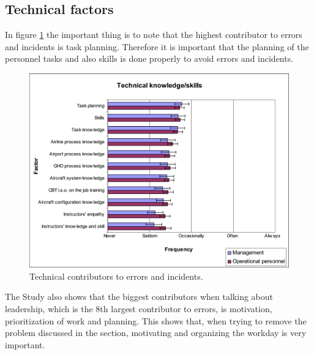 \subsection{Technical factors}
In figure \ref{TechnicalFactors} the important thing is to note that the highest contributor to errors and incidents is task planning. Therefore it is important that the planning of the personnel tasks and also skills is done properly to avoid errors and incidents.

\begin{figure}[H]
\centering
\includegraphics[width=\textwidth]{Grafik/TechnicalFactors}
\caption{Technical contributors to errors and incidents.}
\label{TechnicalFactors}
\end{figure}

The Study also shows that the biggest contributors when talking about leadership, which is the 8th largest contributor to errors, is motivation, prioritization of work and planning. This shows that, when trying to remove the problem discussed in the section, motivating and organizing the workday is very important.